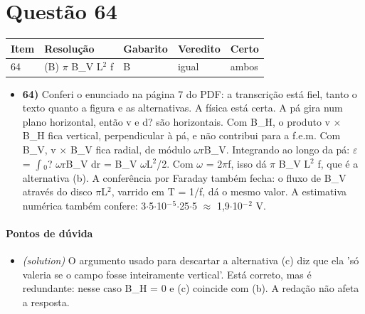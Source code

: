 \documentclass{article}%
\begin{document}
\section*{Questão 64}%
\begin{longtable}{@{}p{} p{} p{} p{} p{}@{}}\toprule Item & Resolução & Gabarito & Veredito & Certo \\ \midrule
64 & (B) $\pi$ B\_V L$^2$ f & B & igual & ambos \\
\bottomrule\end{longtable}%
\begin{itemize}%
\item%
\textbf{64)} Conferi o enunciado na página 7 do PDF: a transcrição está fiel, tanto o texto quanto a figura e as alternativas. A física está certa. A pá gira num plano horizontal, então v e d? são horizontais. Com B\_H, o produto v $\times$ B\_H fica vertical, perpendicular à pá, e não contribui para a f.e.m. Com B\_V, v $\times$ B\_V fica radial, de módulo $\omega$rB\_V. Integrando ao longo da pá: $\varepsilon$ = $\int$$_{0}$? $\omega$rB\_V dr = B\_V $\omega$L$^2$/2. Com $\omega$ = 2$\pi$f, isso dá $\pi$ B\_V L$^2$ f, que é a alternativa (b). A conferência por Faraday também fecha: o fluxo de B\_V através do disco $\pi$L$^2$, varrido em T = 1/f, dá o mesmo valor. A estimativa numérica também confere: 3$\cdot$5$\cdot$10$^{-}$$^{5}$$\cdot$25$\cdot$5 $\approx$ 1,9$\cdot$10$^{-}$$^2$ V.%
\end{itemize}%
\paragraph{Pontos de dúvida}%
\begin{itemize}%
\item%
\textit{(solution)} O argumento usado para descartar a alternativa (c) diz que ela 'só valeria se o campo fosse inteiramente vertical'. Está correto, mas é redundante: nesse caso B\_H = 0 e (c) coincide com (b). A redação não afeta a resposta.%
\end{itemize}%
\end{document}
